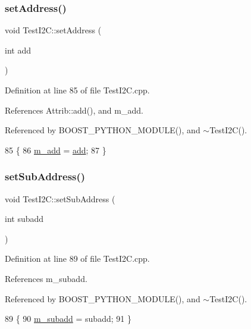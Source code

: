 \subsubsection{\texorpdfstring{set\+Address()}{setAddress()}}
{\footnotesize\ttfamily void Test\+I2\+C\+::set\+Address (\begin{DoxyParamCaption}\item[{int}]{add }\end{DoxyParamCaption})}



Definition at line 85 of file Test\+I2\+C.\+cpp.



References Attrib\+::add(), and m\+\_\+add.



Referenced by B\+O\+O\+S\+T\+\_\+\+P\+Y\+T\+H\+O\+N\+\_\+\+M\+O\+D\+U\+L\+E(), and $\sim$\+Test\+I2\+C().


\begin{DoxyCode}
85                                \{
86   \hyperlink{classTestI2C_a3dbd7e079a36aa6f476f0e3c0a9bf844}{m\_add} = \hyperlink{classAttrib_a235f773af19c900264a190b00a3b4ad7}{add};
87 \}
\end{DoxyCode}
\mbox{\label{classTestI2C_a25776d1fdac40d7285219337ef943b5d}} 
\subsubsection{\texorpdfstring{set\+Sub\+Address()}{setSubAddress()}}
{\footnotesize\ttfamily void Test\+I2\+C\+::set\+Sub\+Address (\begin{DoxyParamCaption}\item[{int}]{subadd }\end{DoxyParamCaption})}



Definition at line 89 of file Test\+I2\+C.\+cpp.



References m\+\_\+subadd.



Referenced by B\+O\+O\+S\+T\+\_\+\+P\+Y\+T\+H\+O\+N\+\_\+\+M\+O\+D\+U\+L\+E(), and $\sim$\+Test\+I2\+C().


\begin{DoxyCode}
89                                      \{
90   \hyperlink{classTestI2C_aad3dc346b1a081e514e1d9681f89738f}{m\_subadd} = subadd;
91 \}
\end{DoxyCode}



